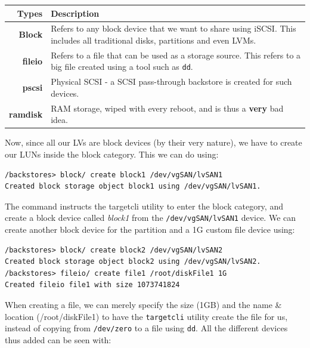 \noindent
\begin{tabular}{rM{0.83}}
	\toprule
	\textbf{Types} &\textbf{Description} \\
	\midrule
	\textbf{Block}	&Refers to any block device that we want to share using iSCSI. This includes all traditional disks, partitions and even LVMs.\\
	\textbf{fileio}	&Refers to a file that can be used as a storage source. This refers to a big file created using a tool such as \verb|dd|.\\
	\textbf{pscsi}	&Physical SCSI - a SCSI pass-through backstore is created for such devices.\\
	\textbf{ramdisk}	&RAM storage, wiped with every reboot, and is thus a \textbf{very} bad idea.\\
	\bottomrule
\end{tabular}

\noindent
Now, since all our LVs are block devices (by their very nature), we have to create our LUNs inside the block category. This we can do using:

\vspace{-15pt}
\begin{verbatim}
/backstores> block/ create block1 /dev/vgSAN/lvSAN1
Created block storage object block1 using /dev/vgSAN/lvSAN1.
\end{verbatim}
\vspace{-10pt}

\noindent
The command instructs the targetcli utility to enter the block category, and create a block device called \textit{block1} from the \verb|/dev/vgSAN/lvSAN1| device. We can create another block device for the partition and a 1G custom file device using:

\vspace{-15pt}
\begin{verbatim}
/backstores> block/ create block2 /dev/vgSAN/lvSAN2
Created block storage object block2 using /dev/vgSAN/lvSAN2.
/backstores> fileio/ create file1 /root/diskFile1 1G
Created fileio file1 with size 1073741824
\end{verbatim}
\vspace{-10pt}

\noindent
When creating a file, we can merely specify the size (1GB) and the name \& location (/root/diskFile1) to have the \verb|targetcli| utility create the file for us, instead of copying from \verb|/dev/zero| to a file using \verb|dd|. All the different devices thus added can be seen with:

